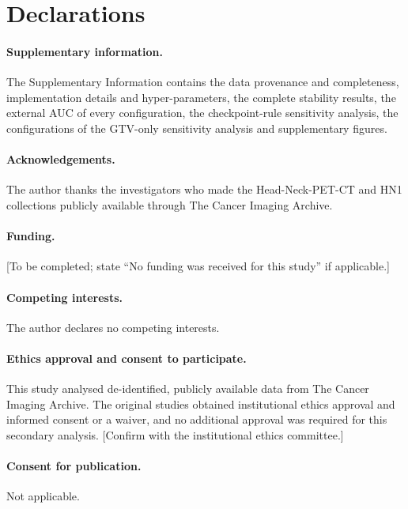 \documentclass[11pt,a4paper]{article}
\begin{document}
\section*{Declarations}

\paragraph{Supplementary information.}The Supplementary Information contains the data provenance and completeness, implementation details and hyper-parameters, the complete stability results, the external AUC of every configuration, the checkpoint-rule sensitivity analysis, the configurations of the GTV-only sensitivity analysis and supplementary figures.

\paragraph{Acknowledgements.}The author thanks the investigators who made the Head-Neck-PET-CT and HN1 collections publicly available through The Cancer Imaging Archive.

\paragraph{Funding.}[To be completed; state ``No funding was received for this study'' if applicable.]

\paragraph{Competing interests.}The author declares no competing interests.

\paragraph{Ethics approval and consent to participate.}This study analysed de-identified, publicly available data from The Cancer Imaging Archive. The original studies obtained institutional ethics approval and informed consent or a waiver, and no additional approval was required for this secondary analysis. [Confirm with the institutional ethics committee.]

\paragraph{Consent for publication.}Not applicable.
\end{document}
